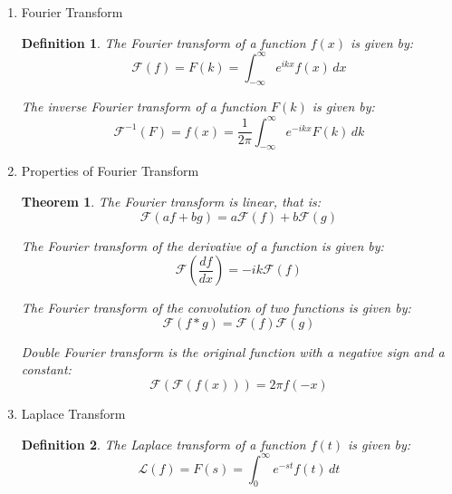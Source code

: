 \documentclass{article}
\newtheorem{definition}{Definition}[section]
\newtheorem{theorem}{Theorem}[section]
\begin{document}
\begin{enumerate}
\begin{proof}
              The general solution is then:
              \begin{equation}
                  \phi(r, \theta) = \sum_{l=0}^{\infty}
                  A_{l} r^l
                  P_{l}(\cos \theta)
                  + \sum_{l=-1}^{-\infty}
                  B_{l} r^{l} P_{l}(\cos \theta)
              \end{equation}
          \end{proof}
    \item Fourier Transform
          \begin{definition}
              The Fourier transform of a function $f(x)$ is given by:
              \begin{equation}
                  \mathcal{F}(f) =  F(k) = \int_{-\infty}^{\infty} e^{ikx} f(x)  \, dx
              \end{equation}

              The inverse Fourier transform of a function $F(k)$ is given by:
              \begin{equation}
                  \mathcal{F}^{-1}(F) = f(x) = \frac{1}{2\pi} \int_{-\infty}^{\infty} e^{-ikx} F(k) \, dk
              \end{equation}
          \end{definition}
    \item Properties of Fourier Transform
          \begin{theorem}
              The Fourier transform is linear, that is:
              \begin{equation}
                  \mathcal{F}(a f + b g) = a \mathcal{F}(f) + b \mathcal{F}(g)
              \end{equation}

              The Fourier transform of the derivative of a function is given by:
              \begin{equation}
                  \mathcal{F}(\frac{df}{dx}) = -ik \mathcal{F}(f)
              \end{equation}

              The Fourier transform of the convolution of two functions is given by:
              \begin{equation}
                  \mathcal{F}(f * g) = \mathcal{F}(f) \mathcal{F}(g)
              \end{equation}

              Double Fourier transform is the original function with a negative sign and a constant:
              \begin{equation}
                  \mathcal{F}(\mathcal{F}(f(x))) = 2\pi f(-x)
              \end{equation}
          \end{theorem}
    \item Laplace Transform
          \begin{definition}
              The Laplace transform of a function $f(t)$ is given by:
              \begin{equation}
                  \mathcal{L}(f) =  F(s) = \int_{0}^{\infty} e^{-st} f(t)  \, dt
              \end{equation}


\end{definition}
\end{enumerate}
\end{document}
